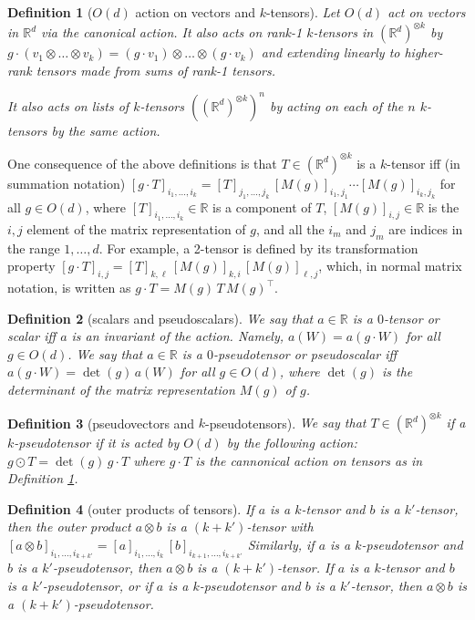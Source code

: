 \documentclass{article}
\theoremstyle{plain}
\newtheorem{definition}{Definition}
\begin{document}
\begin{definition}[$O(d)$ action on vectors and $k$-tensors] \label{def.tensors}
Let $O(d)$ act on vectors in $\mathbb R^d$ via the canonical action.
It also acts on rank-1 $k$-tensors in $(\mathbb R^d)^{\otimes k}$ by $g\cdot (v_{1}\otimes\ldots \otimes v_k) = (g\cdot v_1)\otimes \ldots \otimes (g\cdot v_k)$ and extending linearly to higher-rank tensors made from sums of rank-1 tensors.

It also acts on lists of $k$-tensors $((\mathbb R^d)^{\otimes k})^n$ by acting on each of the $n$ $k$-tensors by the same action.
\end{definition}

One consequence of the above definitions is that 
$T\in (\mathbb R^d)^{\otimes k}$ is a $k$-tensor iff (in summation notation)
$[g\cdot T]_{i_1,\ldots, i_k} = [T]_{j_1,\ldots,j_k}\,[M(g)]_{i_1,j_1}\cdots[M(g)]_{i_k,j_k}$ for all $g\in O(d)$, where $[T]_{i_1, \ldots ,i_k} \in \mathbb R$ is a component of $T$, $[M(g)]_{i,j}\in\mathbb R$ is the $i,j$ element of the matrix representation of $g$, and all the $i_m$ and $j_m$ are indices in the range $1,\ldots,d$.
For example, a 2-tensor is defined by its transformation property
$[g\cdot T]_{i,j} = [T]_{k,\ell}\,[M(g)]_{k,i}\,[M(g)]_{\ell,j}$,
which, in normal matrix notation, is written as
$g\cdot T = M(g)\,T\,M(g)^\top$.


\begin{definition}[scalars and pseudoscalars]
We say that $a\in \mathbb R$ is a $0$-tensor or scalar iff $a$ is an invariant of the action.
Namely, $a(W) = a(g\cdot W)$ for all $g\in O(d)$.
We say that
$a\in \mathbb R$ is a $0$-pseudotensor or pseudoscalar iff $a(g \cdot W) = \det(g)\,a(W)$ for all $g\in O(d)$,
where $\det(g)$ is the determinant of the matrix representation $M(g)$ of $g$.
\end{definition}

\begin{definition}[pseudovectors and $k$-pseudotensors]
We say that $T\in (\mathbb R^d)^{\otimes k}$ if a $k$-pseudotensor if it is acted by $O(d)$ by the following action: $g\odot T = \det(g)\, g \cdot T$ where $g\cdot T$ is the cannonical action on tensors as in Definition \ref{def.tensors}.
\end{definition}

\begin{definition}[outer products of tensors]
If $a$ is a $k$-tensor and $b$ is a $k'$-tensor, then the outer product $a\otimes b$ is a $(k+k')$-tensor with $[a\otimes b]_{i_1,\ldots,i_{k+k'}} = [a]_{i_1,\ldots,i_k}\,[b]_{i_{k+1},\ldots,i_{k+k'}}$
Similarly, if $a$ is a $k$-pseudotensor and $b$ is a $k'$-pseudotensor, then $a\otimes b$ is a $(k+k')$-tensor.
If $a$ is a $k$-tensor and $b$ is a $k'$-pseudotensor, or if $a$ is a $k$-pseudotensor and $b$ is a $k'$-tensor, then $a\otimes b$ is a $(k+k')$-pseudotensor.
\end{definition}
\end{document}
